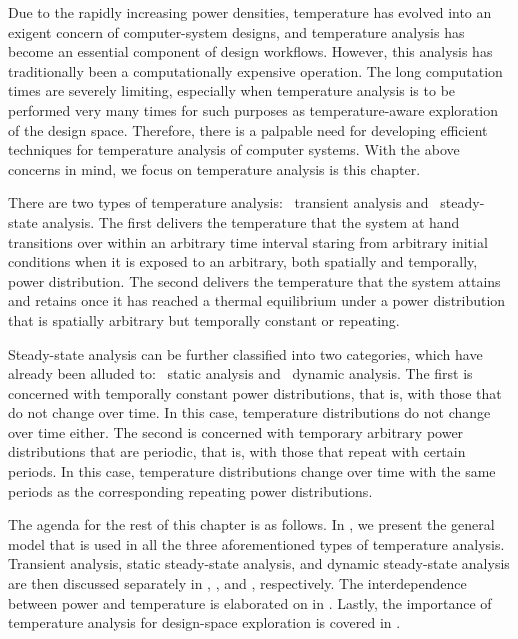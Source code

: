 Due to the rapidly increasing power densities, temperature has evolved into an
exigent concern of computer-system designs, and temperature analysis has become
an essential component of design workflows. However, this analysis has
traditionally been a computationally expensive operation. The long computation
times are severely limiting, especially when temperature analysis is to be
performed very many times for such purposes as temperature-aware exploration of
the design space. Therefore, there is a palpable need for developing efficient
techniques for temperature analysis of computer systems. With the above concerns
in mind, we focus on temperature analysis is this chapter.

There are two types of temperature analysis: \one~transient analysis and
\two~steady-state analysis. The first delivers the temperature that the system
at hand transitions over within an arbitrary time interval staring from
arbitrary initial conditions when it is exposed to an arbitrary, both spatially
and temporally, power distribution. The second delivers the temperature that the
system attains and retains once it has reached a thermal equilibrium under a
power distribution that is spatially arbitrary but temporally constant or
repeating.

Steady-state analysis can be further classified into two categories, which have
already been alluded to: \one~static analysis and \two~dynamic analysis. The
first is concerned with temporally constant power distributions, that is, with
those that do not change over time. In this case, temperature distributions do
not change over time either. The second is concerned with temporary arbitrary
power distributions that are periodic, that is, with those that repeat with
certain periods. In this case, temperature distributions change over time with
the same periods as the corresponding repeating power distributions.

The agenda for the rest of this chapter is as follows. In
, we present the general model that is used in all the
three aforementioned types of temperature analysis. Transient analysis, static
steady-state analysis, and dynamic steady-state analysis are then discussed
separately in , , and
, respectively. The interdependence between power and
temperature is elaborated on in . Lastly, the
importance of temperature analysis for design-space exploration is covered in
.
